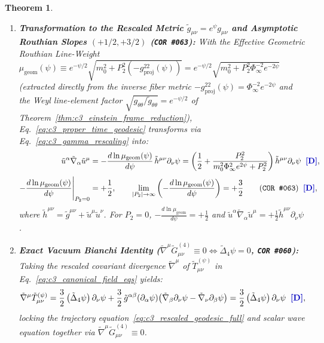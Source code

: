 \documentclass[11pt,a4paper]{article}
\newcommand{\catD}{\text{\textbf{\textcolor{blue!75!black}{[D]}}}}
\theoremstyle{definition}
\theoremstyle{plain}
\newtheorem{theorem}[axiom]{Theorem}
\theoremstyle{remark}
\begin{document}
\begin{theorem}
\begin{enumerate}[label=(\roman*)]
  \item \textbf{Transformation to the Rescaled Metric $\tilde{g}_{\mu\nu} = e^\psi g_{\mu\nu}$ and Asymptotic Routhian Slopes $(+1/2, +3/2)$ (\texttt{COR~\#063}):}
  With the Effective Geometric Routhian Line-Weight $\mu_{\mathrm{geom}}(\psi) \equiv e^{-\psi/2}\sqrt{m_0^2 + P_2^2(-g^{22}_{\mathrm{proj}}(\psi))} = e^{-\psi/2}\sqrt{m_0^2 + P_2^2\Phi_\infty^{-2}e^{-2\psi}}$ (extracted directly from the inverse fiber metric $-g^{22}_{\mathrm{proj}}(\psi) = \Phi_\infty^{-2}e^{-2\psi}$ and the Weyl line-element factor $\sqrt{g_{\theta\theta}/\tilde{g}_{\theta\theta}} = e^{-\psi/2}$ of Theorem~\ref{thm:c3_einstein_frame_reduction}), Eq.~\eqref{eq:c3_proper_time_geodesic} transforms via Eq.~\eqref{eq:c3_gamma_rescaling} into:
  \begin{align}
  \tilde{u}^\alpha\tilde{\nabla}_\alpha\tilde{u}^\mu &= -\frac{d\ln\mu_{\mathrm{geom}}(\psi)}{d\psi}\,\tilde{h}^{\mu\nu}\partial_\nu\psi = \left(\frac{1}{2} + \frac{P_2^2}{m_0^2\Phi_\infty^2 e^{2\psi} + P_2^2}\right)\tilde{h}^{\mu\nu}\partial_\nu\psi \;\;\catD, \nonumber \\[3pt]
  -\frac{d\ln\mu_{\mathrm{geom}}(\psi)}{d\psi}\Bigg|_{P_2=0} &= +\frac{1}{2}, \qquad
  \lim_{|P_2|\to\infty}\left(-\frac{d\ln\mu_{\mathrm{geom}}(\psi)}{d\psi}\right) = +\frac{3}{2} \qquad \textnormal{(\texttt{COR~\#063})} \;\;\catD, \label{eq:c3_rescaled_geodesic_full}
  \end{align}
  where $\tilde{h}^{\mu\nu} = \tilde{g}^{\mu\nu} + \tilde{u}^\mu\tilde{u}^\nu$. For $P_2 = 0$, $-\frac{d\ln\mu_{\mathrm{geom}}}{d\psi} = +\frac{1}{2}$ and $\tilde{u}^\alpha\tilde{\nabla}_\alpha\tilde{u}^\mu = +\frac{1}{2}\tilde{h}^{\mu\nu}\partial_\nu\psi$ \catD.

  \item \textbf{Exact Vacuum Bianchi Identity ($\tilde{\nabla}^\mu\tilde{G}_{\mu\nu}^{(4)} \equiv 0 \Longleftrightarrow \tilde{\Delta}_4\psi = 0$, \texttt{COR~\#060}):}
  Taking the rescaled covariant divergence $\tilde{\nabla}^\mu$ of $\tilde{T}_{\mu\nu}^{(\psi)}$ in Eq.~\eqref{eq:c3_canonical_field_eqs} yields:
  \begin{equation}\label{eq:c3_bianchi_scalar_div}
  \tilde{\nabla}^\mu\tilde{T}_{\mu\nu}^{(\psi)} = \frac{3}{2}\left(\tilde{\Delta}_4\psi\right)\partial_\nu\psi + \frac{3}{2}\,\tilde{g}^{\alpha\beta}\!\left(\partial_\alpha\psi\right)\!\left(\tilde{\nabla}_\beta\partial_\nu\psi - \tilde{\nabla}_\nu\partial_\beta\psi\right) = \frac{3}{2}\left(\tilde{\Delta}_4\psi\right)\partial_\nu\psi \;\;\catD,
  \end{equation}
  locking the trajectory equation~\eqref{eq:c3_rescaled_geodesic_full} and scalar wave equation together via $\tilde{\nabla}^\mu\tilde{G}_{\mu\nu}^{(4)} \equiv 0$.
\end{enumerate}
\end{theorem}
\end{document}
